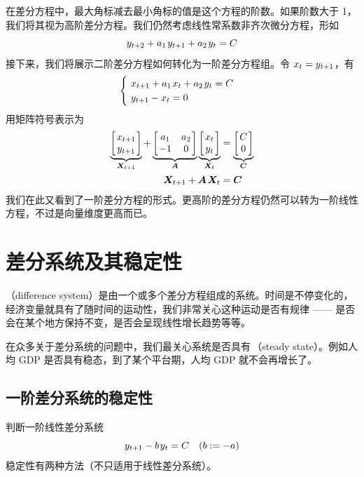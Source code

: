 在差分方程中，最大角标减去最小角标的值是这个方程的阶数。如果阶数大于 1，我们将其视为高阶差分方程。我们仍然考虑线性常系数非齐次微分方程，形如
\begin{equation}
    y\nnt + a_1\,y\nt + a_2\,y_t = C
\end{equation}
接下来，我们将展示二阶差分方程如何转化为一阶差分方程组。令 \(x_t=y_{t+1}\)，有
\begin{equation}
    \begin{cases}
        \ x\nt + a_1\,x_t + a_2\,y_t = C\\
        \ y\nt - x_t = 0
    \end{cases}
\end{equation}
用矩阵符号表示为
\begin{align}
    \underbrace{\matbks{x\nt\\y\nt}}_{\bs X\nt}+\underbrace{\matbks{a_1 & a_2\\-1 & 0}}_{\bs A}\underbrace{\matbks{x_t\\y_t}}_{\bs X_t}&=\underbrace{\matbks{C\\0}}_{\bs C}\\
    \bsX\nt+\bsA\,\bsX_t&=\bs C\label{eq:DiffEquMatrix}
\end{align}
我们在此又看到了一阶差分方程的形式。更高阶的差分方程仍然可以转为一阶线性方程，不过是向量维度更高而已。

\section{差分系统及其稳定性}{\label{sec:DiffSysStable}}

（difference system）是由一个或多个差分方程组成的系统。时间是不停变化的，经济变量就具有了随时间的运动性，我们非常关心这种运动是否有规律 —— 是否会在某个地方保持不变，是否会呈现线性增长趋势等等。

在众多关于差分系统的问题中，我们最关心系统是否具有\,（steady state）。例如人均 GDP 是否具有稳态，到了某个平台期，人均 GDP 就不会再增长了。

\subsection{一阶差分系统的稳定性}{\label{subsec:FDiffSysStable}}

判断一阶线性差分系统
\begin{equation}
    y\nt - b\,y_t = C \quad (b:=-a)
\end{equation}
稳定性有两种方法（不只适用于线性差分系统）。

